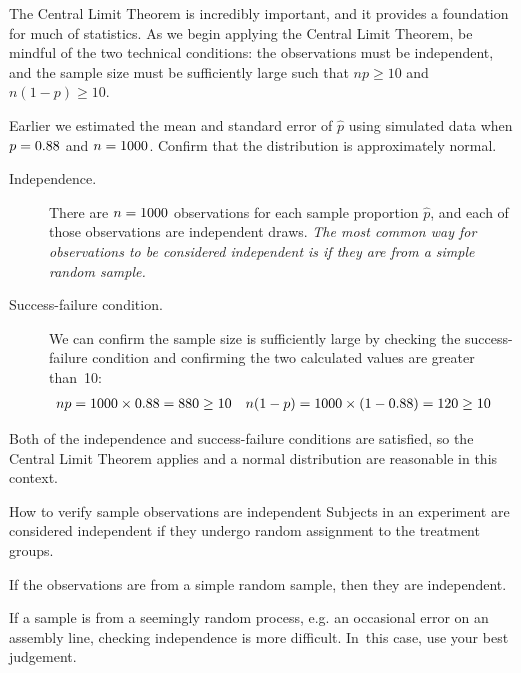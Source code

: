 The Central Limit Theorem is incredibly important, and it provides
a foundation for much of statistics.
As we begin applying
the Central Limit Theorem, be mindful of the two
technical conditions:
the observations must be independent, and the sample size must
be sufficiently large such that $np \geq 10$ and $n(1-p) \geq 10$.

\begin{examplewrap}
\begin{nexample}{Earlier we estimated the mean and standard
error of $\hat{p}$ using simulated data when
$p = 0.88{}$ and $n = 1000{}$.
Confirm that the distribution is approximately
normal.}\label{sample_p88_n1000_confirm_normal}
\begin{description}
\item[Independence.] There are $n = 1000{}$
    observations for each
    sample proportion $\hat{p}$, and each of those observations
    are independent draws. \emph{The most common way for
    observations to be considered independent is if they are from
    a simple random sample.}
\item[Success-failure condition.] We can confirm the sample size
    is sufficiently large by checking the success-failure condition
    and confirming the two calculated values are greater than~10:
    \begin{align*}
    np &= 1000{} \times 0.88{}
        = 880{}
        \geq 10
    &n(1-p) &= 1000{} \times (1 - 0.88{})
        = 120{}
        \geq 10
    \end{align*}
\end{description}
Both of the independence and success-failure conditions are
satisfied, so the Central Limit Theorem applies and a normal
distribution are reasonable in this context.
\end{nexample}
\end{examplewrap}

\begin{onebox}{How to verify sample observations are independent}
  Subjects in an experiment are considered independent
  if they undergo random assignment to the treatment
  groups.\stdvspace{}

  If the observations are from a simple random sample,
  then they are independent.\stdvspace{}

  If a sample is from a seemingly random process,
  e.g. an occasional error on an assembly line,
  checking independence is more difficult. In~this case,
  use your best judgement.
\end{onebox}

